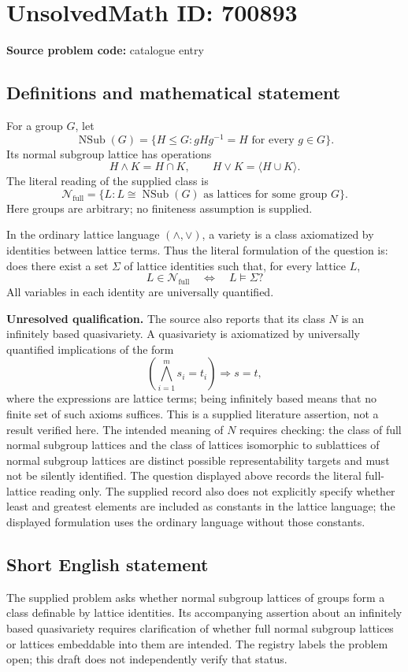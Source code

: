 \documentclass[11pt]{article}
\begin{document}
\section*{UnsolvedMath ID: 700893}
\textbf{Source problem code:} catalogue entry
\subsection{Definitions and mathematical statement}
For a group \(G\), let
\[
\operatorname{NSub}(G)=\{H\leq G: gHg^{-1}=H\text{ for every }g\in G\}.
\]
Its normal subgroup lattice has operations
\[
H\wedge K=H\cap K,\qquad H\vee K=\langle H\cup K\rangle.
\]
The literal reading of the supplied class is
\[
\mathcal N_{\mathrm{full}}=\{L:L\cong\operatorname{NSub}(G)\text{ as lattices for some group }G\}.
\]
Here groups are arbitrary; no finiteness assumption is supplied.

In the ordinary lattice language \((\wedge,\vee)\), a variety is a class axiomatized by identities between lattice terms. Thus the literal formulation of the question is: does there exist a set \(\Sigma\) of lattice identities such that, for every lattice \(L\),
\[
L\in\mathcal N_{\mathrm{full}}\quad\Longleftrightarrow\quad L\models\Sigma?
\]
All variables in each identity are universally quantified.

\textbf{Unresolved qualification.} The source also reports that its class \(N\) is an infinitely based quasivariety. A quasivariety is axiomatized by universally quantified implications of the form
\[
\left(\bigwedge_{i=1}^{m}s_i=t_i\right)\Longrightarrow s=t,
\]
where the expressions are lattice terms; being infinitely based means that no finite set of such axioms suffices. This is a supplied literature assertion, not a result verified here. The intended meaning of \(N\) requires checking: the class of full normal subgroup lattices and the class of lattices isomorphic to sublattices of normal subgroup lattices are distinct possible representability targets and must not be silently identified. The question displayed above records the literal full-lattice reading only. The supplied record also does not explicitly specify whether least and greatest elements are included as constants in the lattice language; the displayed formulation uses the ordinary language without those constants.
\subsection{Short English statement}
The supplied problem asks whether normal subgroup lattices of groups form a class definable by lattice identities. Its accompanying assertion about an infinitely based quasivariety requires clarification of whether full normal subgroup lattices or lattices embeddable into them are intended. The registry labels the problem open; this draft does not independently verify that status.
\end{document}
